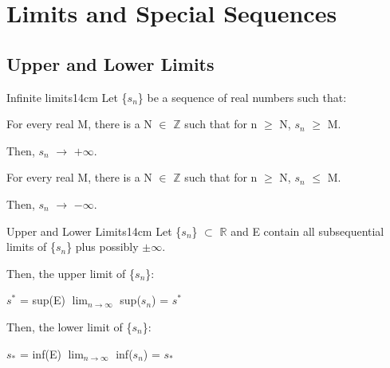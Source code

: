 \newpage

\section[Day 9: Limits \& Special Sequences]{ Limits and Special Sequences }

\subsection{ Upper and Lower Limits } 

	\begin{definition}{Infinite limits}{14cm}
		Let \{$s_n$\} be a sequence of real numbers such that:

		\hspace{1cm}
		For every real M, there is a N $\in$ $\mathbb{Z}$ such that
		for n $\geq$ N, $s_n$ $\geq$ M.

		\hspace{2cm}
		Then, $s_n$ $\rightarrow$ $+\infty$.

		\hspace{1cm}
		For every real M, there is a N $\in$ $\mathbb{Z}$ such that
		for n $\geq$ N, $s_n$ $\leq$ M.

		\hspace{2cm}
		Then, $s_n$ $\rightarrow$ $-\infty$.		
	\end{definition}
	
	\vspace{0.5cm}



	\begin{definition}{Upper and Lower Limits}{14cm}
		Let \{$s_n$\} $\subset$ $\mathbb{R}$
		and E contain all subsequential limits of \{$s_n$\}
		plus possibly $\pm$$\infty$.

		Then, the upper limit of \{$s_n$\}:

		\hspace{1cm}
		$s^*$ = sup(E) 
		\hspace{1cm} 
		$\lim_{n \rightarrow \infty}$ sup($s_n$) = $s^*$

		Then, the lower limit of \{$s_n$\}:

		\hspace{1cm}
		$s_*$ = inf(E) 
		\hspace{1.2cm} 
		$\lim_{n \rightarrow \infty}$ inf($s_n$) = $s_*$
	\end{definition}
	


